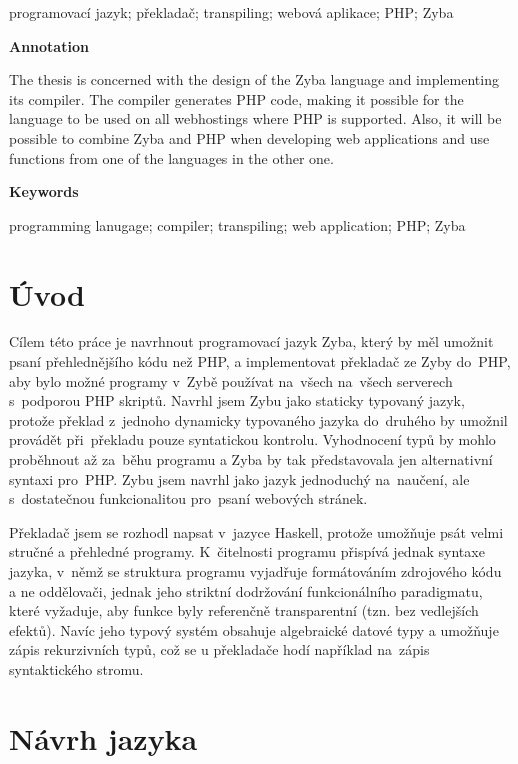 \documentclass[a4paper,12pt]{article}
\begin{document}
programovací jazyk; překladač; transpiling; webová aplikace; PHP; Zyba

\Large\textbf{Annotation}\normalsize

The thesis is concerned with the design of the Zyba language and implementing its compiler. The compiler generates PHP code, making it possible for the language to be used on all webhostings where PHP is supported. Also, it will be possible to combine Zyba and PHP when developing web applications and use functions from one of the languages in the other one.

\Large\textbf{Keywords}\normalsize

programming lanugage; compiler; transpiling; web application; PHP; Zyba
\newpage
\thispagestyle{empty}
\tableofcontents
\newpage
\section{Úvod}
Cílem této práce je navrhnout programovací jazyk Zyba, který by měl umožnit psaní přehlednějšího kódu než PHP, a implementovat překladač ze Zyby do~PHP, aby bylo možné programy v~Zybě používat na~všech na~všech serverech s~podporou PHP skriptů. Navrhl jsem Zybu jako staticky typovaný jazyk, protože překlad z~jednoho dynamicky typovaného jazyka do~druhého by umožnil provádět při~překladu pouze syntatickou kontrolu. Vyhodnocení typů by mohlo proběhnout až za~běhu programu a Zyba by tak představovala jen alternativní syntaxi pro~PHP. Zybu jsem navrhl jako jazyk jednoduchý na~naučení, ale s~dostatečnou funkcionalitou pro~psaní webových stránek.

Překladač jsem se rozhodl napsat v~jazyce Haskell, protože umožňuje psát velmi stručné a přehledné programy. K~čitelnosti programu přispívá jednak syntaxe jazyka, v~němž se struktura programu vyjadřuje formátováním zdrojového kódu a ne oddělovači, jednak jeho striktní dodržování funkcionálního paradigmatu, které vyžaduje, aby funkce byly referenčně transparentní (tzn. bez vedlejších efektů). Navíc jeho typový systém obsahuje algebraické datové typy a umožňuje zápis rekurzivních typů, což se u překladače hodí například na~zápis syntaktického stromu.

\section{Návrh jazyka}
\end{document}
